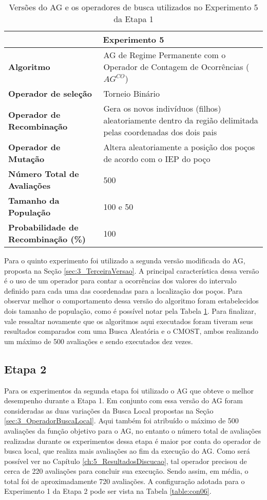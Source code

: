 \begin{table}[!htbp]
\centering
\caption{Versões do AG e os operadores de busca utilizados no Experimento 5 da Etapa 1}
\label{table:con05}
\begin{tabular}{|p{6cm}|p{9cm}|}
\hline
 
 \multicolumn{2}{|c|}{\textbf{Experimento 5}} \\ \hline
\textbf{Algoritmo} &AG de Regime Permanente com o Operador de Contagem de Ocorrências ($AG^{CO}$) \\ \hline
\textbf{Operador de seleção} & Torneio Binário \\ \hline
\textbf{Operador de Recombinação} & Gera os novos indivíduos (filhos) aleatoriamente dentro da região delimitada pelas coordenadas dos dois pais \\  \hline
\textbf{Operador de Mutação} & Altera aleatoriamente a posição dos poços de acordo com o IEP do poço \\ \hline
\textbf{Número Total de Avaliações} & 500 \\ \hline
\textbf{Tamanho da População} & 100 e 50 \\ \hline
\textbf{Probabilidade de Recombinação (\%)} & 100 \\ \hline
\end{tabular}
\end{table} 

Para o quinto experimento foi utilizado a segunda versão modificada do AG, proposta na Seção \ref{sec:3_TerceiraVersao}. A principal característica dessa versão é o uso de um operador para contar a ocorrências dos valores do intervalo definido para cada uma das coordenadas para a localização dos poços. Para observar melhor o comportamento dessa versão do algoritmo foram estabelecidos dois tamanho de população, como é possível notar pela Tabela \ref{table:con05}. Para finalizar, vale ressaltar novamente que os algoritmos aqui executados foram tiveram seus resultados comparados com uma Busca Aleatória e o CMOST, ambos realizando um  máximo de 500 avaliações e sendo executados dez vezes.

\subsection{Etapa 2}
\label{sec:4_Etapa2}
Para os experimentos da segunda etapa foi utilizado o AG que obteve o melhor desempenho durante a Etapa 1. Em conjunto com essa versão do AG foram consideradas as duas variações da Busca Local propostas na Seção \ref{sec:3_OperadorBuscaLocal}. Aqui também foi atribuído o máximo de 500 avaliações da função objetivo  para o AG, no entanto o número total de avaliações realizadas durante os experimentos dessa etapa é maior por conta do operador de busca local, que realiza mais avaliações ao fim da execução do AG. Como será possível ver no Capítulo \ref{ch:5_ResultadosDiscucao}, tal operador precisou de cerca de 220 avaliações para concluir sua execução. Sendo assim, em média, o total foi de aproximadamente 720 avaliações. A configuração adotada para o Experimento 1 da Etapa 2 pode ser vista na Tabela \ref{table:con06}.


